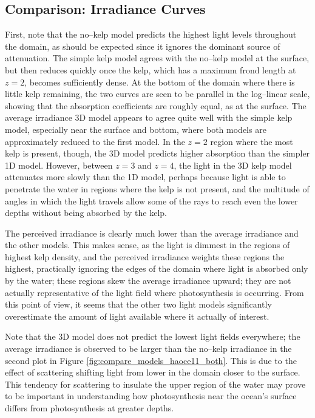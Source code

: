 \subsection{Comparison: Irradiance Curves}
First, note that the no--kelp model predicts the highest light levels throughout the domain, as should be expected since it ignores the dominant source of attenuation.
The simple kelp model agrees with the no--kelp model at the surface, but then reduces quickly once the kelp, which has a maximum frond length at $z=2$, becomes sufficiently dense.
At the bottom of the domain where there is little kelp remaining, the two curves are seen to be parallel in the log--linear scale, showing that the absorption coefficients are roughly equal, as at the surface.
The average irradiance 3D model appears to agree quite well with the simple kelp model, especially near the surface and bottom, where both models are approximately reduced to the first model.
In the $z=2$ region where the most kelp is present, though, the 3D model predicts higher absorption than the simpler 1D model.
However, between $z=3$ and $z=4$, the light in the 3D kelp model attenuates more slowly than the 1D model, perhaps because light is able to penetrate the water in regions where the kelp is not present, and the multitude of angles in which the light travels allow some of the rays to reach even the lower depths without being absorbed by the kelp.

The perceived irradiance is clearly much lower than the average irradiance and the other models.
This makes sense, as the light is dimmest in the regions of highest kelp density, and the perceived irradiance weights these regions the highest, practically ignoring the edges of the domain where light is absorbed only by the water; these regions skew the average irradiance upward; they are not actually representative of the light field where photosynthesis is occurring.
From this point of view, it seems that the other two light models significantly overestimate the amount of light available where it actually of interest.

Note that the 3D model does not predict the lowest light fields everywhere; the average irradiance is observed to be larger than the no--kelp irradiance in the second plot in Figure \ref{fig:compare_models_haoce11_both}.
This is due to the effect of scattering shifting light from lower in the domain closer to the surface.
This tendency for scattering to insulate the upper region of the water may prove to be important in understanding how photosynthesis near the ocean's surface differs from photosynthesis at greater depths.

